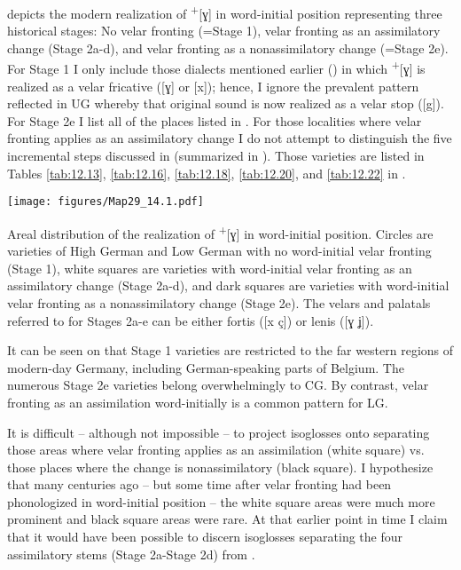  depicts the modern realization of  \textsuperscript{+}[ɣ] in word-initial position representing three historical stages: No velar fronting (=Stage 1), velar fronting as an assimilatory change (Stage 2a-d), and velar fronting as a nonassimilatory change (=Stage 2e). For Stage 1 I only include those dialects mentioned earlier () in which  \textsuperscript{+}[ɣ] is realized as a velar fricative ([ɣ] or [x]); hence, I ignore the prevalent pattern reflected in UG whereby that original sound is now realized as a velar stop ([g]). For Stage 2e I list all of the places listed in . For those localities where velar fronting applies as an assimilatory change I do not attempt to distinguish the five incremental steps discussed in  (summarized in ). Those varieties are listed in Tables \ref{tab:12.13}, \ref{tab:12.16}, \ref{tab:12.18}, \ref{tab:12.20}, and \ref{tab:12.22} in .\largerpage

\begin{map}
\texttt{[image: figures/Map29\_14.1.pdf]}
\caption[Areal distribution of the realization of West Germanic {\textsuperscript{+}[ɣ]} in word-initial position]{Areal distribution of the realization of  \textsuperscript{+}[ɣ] in word-initial position. Circles are varieties of High German and Low German with no word-initial velar fronting (Stage 1), white squares are varieties with word-initial velar fronting as an assimilatory change (Stage 2a-d), and dark squares are varieties with word-initial velar fronting as a nonassimilatory change (Stage 2e). The velars and palatals referred to for Stages 2a-e can be either fortis ([x ç]) or lenis ([ɣ ʝ]).}\label{map:29}
\end{map}

It can be seen on  that Stage 1 varieties are restricted to the far western regions of modern-day Germany, including German-speaking parts of Belgium. The numerous Stage 2e varieties belong overwhelmingly to CG. By contrast, velar fronting as an assimilation word-initially is a common pattern for LG.

It is difficult -- although not impossible -- to project isoglosses onto  separating those areas where velar fronting applies as an assimilation (white square) vs. those places where the change is nonassimilatory (black square). I hypothesize that many centuries ago -- but some time after velar fronting had been phonologized in word-initial position -- the white square areas were much more prominent and black square areas were rare. At that earlier point in time I claim that it would have been possible to discern isoglosses separating the four assimilatory stems (Stage 2a-Stage 2d) from .

